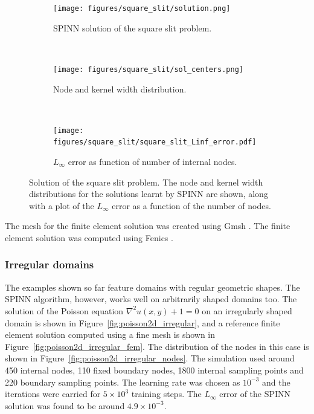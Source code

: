 \documentclass[12pt]{article}
\newcommand{\rb}[1]{#1}
\begin{document}
\begin{figure}
\begin{subfigure}{0.32\textwidth}
\texttt{[image: figures/square\_slit/solution.png]}
\caption{SPINN solution of the square slit problem.}
\label{fig:poisson_2d_square_slit_sol}
\end{subfigure}
~
\begin{subfigure}{0.32\textwidth}
\texttt{[image: figures/square\_slit/sol\_centers.png]}
\caption{Node and kernel width distribution.}
\label{fig:poisson_2d_square_slit_nodes}
\end{subfigure}
~
\begin{subfigure}{0.32\textwidth}
\texttt{[image: figures/square\_slit/square\_slit\_Linf\_error.pdf]}
\caption{$L_{\infty}$ error as function of number of internal nodes.}
\label{fig:poisson_2d_square_slit_convergence}
\end{subfigure}
\caption{Solution of the square slit problem. The node and kernel width distributions for the solutions learnt by SPINN are shown, along with a plot of the $L_\infty$ error as a function of the number of nodes.}
\label{fig:spinn_pde2d_square_slit}
\end{figure}

The mesh for the finite element solution was created using Gmsh \cite{gmsh}. The finite element solution was computed using Fenics \cite{AlnaesBlechta2015a, LoggMardalEtAl2012a}.

\subsubsection{Irregular domains}
The examples shown so far feature domains with regular geometric shapes. The SPINN algorithm, however, works well on arbitrarily shaped domains too. The solution of the Poisson equation $\nabla^2 u(x,y) + 1 = 0$ on an irregularly shaped domain is shown in Figure~\ref{fig:poisson2d_irregular}, and a reference finite element solution computed using a fine mesh is shown in Figure~\ref{fig:poisson2d_irregular_fem}. The distribution of the nodes in this case is shown in Figure~\ref{fig:poisson2d_irregular_nodes}. \rb{The simulation used around 450 internal nodes, 110 fixed boundary nodes, 1800 internal sampling points and 220 boundary sampling points. The learning rate was chosen as $10^{-3}$ and the iterations were carried for $5\times10^{3}$ training steps.} The $L_{\infty}$ error of the SPINN solution was found to be around $4.9\times 10^{-3}$.
\end{document}

